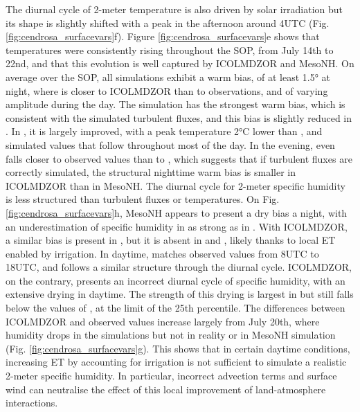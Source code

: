 The diurnal cycle of 2-meter temperature is also driven by solar irradiation but its shape is slightly shifted with a peak in the afternoon around 4UTC (Fig. \ref{fig:cendrosa_surfacevars}f). Figure \ref{fig:cendrosa_surfacevars}e shows that temperatures were consistently rising throughout the SOP, from July 14th to 22nd, and that this evolution is well captured by ICOLMDZOR and MesoNH.
On average over the SOP, all simulations exhibit a warm bias, of at least 1.5° at night, where \mesoexact is closer to ICOLMDZOR than to observations, and of varying amplitude during the day. The \irr simulation has the strongest warm bias, which is consistent with the simulated turbulent fluxes, and this bias is slightly reduced in \irr. In \irrboost, it is largely improved, with a peak temperature 2°C lower than \irr, and simulated values that follow \mesomean throughout most of the day. In the evening, \irrboost even falls closer to observed values than to \mesomean, which suggests that if turbulent fluxes are correctly simulated, the structural nighttime warm bias is smaller in ICOLMDZOR than in MesoNH.
The diurnal cycle for 2-meter specific humidity is less structured than turbulent fluxes or temperatures.
On Fig. \ref{fig:cendrosa_surfacevars}h, MesoNH appears to present a dry bias a night, with an underestimation of specific humidity in \mesoexact as strong as in \mesomean. With ICOLMDZOR, a similar bias is present in \noirr, but it is absent in \irr and \irrboost, likely thanks to local ET enabled by irrigation.
In daytime, \mesoexact matches observed values from 8UTC to 18UTC, and \mesomean follows a similar structure through the diurnal cycle. 
ICOLMDZOR, on the contrary, presents an incorrect diurnal cycle of specific humidity, with an extensive drying in daytime. The strength of this drying is largest in \noirr but \irrboost still falls below the values of \mesomean, at the limit of the 25th percentile. 
The differences between ICOLMDZOR and observed values increase largely from July 20th, where humidity drops in the simulations but not in reality or in MesoNH simulation (Fig. \ref{fig:cendrosa_surfacevars}g).
This shows that in certain daytime conditions, increasing ET by accounting for irrigation is not sufficient to simulate a realistic 2-meter specific humidity. In particular, incorrect advection terms and surface wind can neutralise the effect of this local improvement of land-atmosphere interactions.

